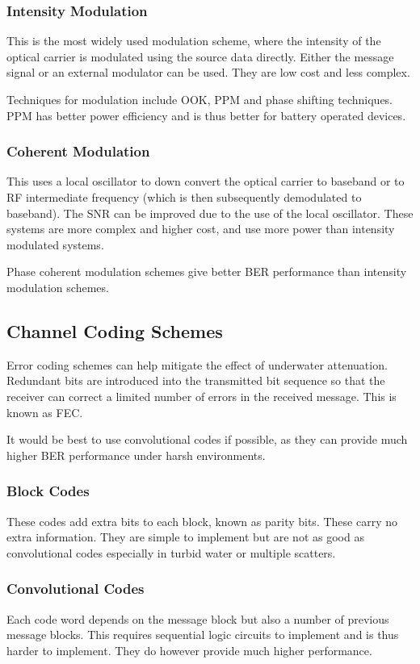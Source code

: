 \documentclass{article}
\begin{document}
\subsubsection{Intensity Modulation}
This is the most widely used modulation scheme, where the intensity of the optical carrier is modulated using the source data directly. Either the message signal or an external modulator can be used. They are low cost and less complex.

Techniques for modulation include \ac{OOK}, \ac{PPM} and phase shifting techniques. \ac{PPM} has better power efficiency and is thus better for battery operated devices.

\subsubsection{Coherent Modulation}
This uses a local oscillator to down convert the optical carrier to baseband or to \ac{RF} intermediate frequency (which is then subsequently demodulated to baseband). The \ac{SNR} can be improved due to the use of the local oscillator. These systems are more complex and higher cost, and use more power than intensity modulated systems.

Phase coherent modulation schemes give better \ac{BER} performance than intensity modulation schemes.

\subsection{Channel Coding Schemes}
Error coding schemes can help mitigate the effect of underwater attenuation. Redundant bits are introduced into the transmitted bit sequence so that the receiver can correct a limited number of errors in the received message. This is known as \ac{FEC}.

It would be best to use convolutional codes if possible, as they can provide much higher \ac{BER} performance under harsh environments.

\subsubsection{Block Codes}
These codes add extra bits to each block, known as parity bits. These carry no extra information. They are simple to implement but are not as good as convolutional codes especially in turbid water or multiple scatters.

\subsubsection{Convolutional Codes}
Each code word depends on the message block but also a number of previous message blocks. This requires sequential logic circuits to implement and is thus harder to implement. They do however provide much higher performance.
\end{document}
